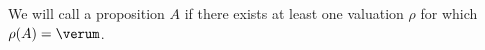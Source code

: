 \begin{definition}\label{prop-000M}%
We will call a proposition $A$  if there exists at
least one valuation $\rho$ for which $\rho(A)=\verum$. 
\end{definition}
